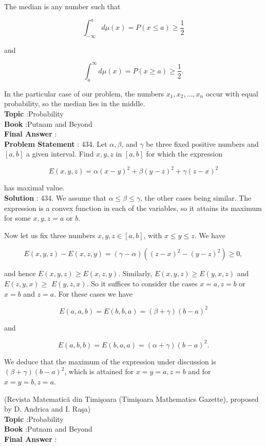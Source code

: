 \documentclass[10pt]{article}
\begin{document}
The median is any number such that

$$
\int_{-\infty}^{a} d \mu(x)=P(x \leq a) \geq \frac{1}{2}
$$

and

$$
\int_{a}^{\infty} d \mu(x)=P(x \geq a) \geq \frac{1}{2} .
$$

In the particular case of our problem, the numbers $x_{1}, x_{2}, \ldots, x_{n}$ occur with equal probability, so the median lies in the middle.
\\
\textbf{Topic} :Probability\\
\textbf{Book} :Putnam and Beyond\\
\textbf{Final Answer} :\\


\textbf{Problem Statement} :
434. Let $\alpha, \beta$, and $\gamma$ be three fixed positive numbers and $[a, b]$ a given interval. Find $x, y, z$ in $[a, b]$ for which the expression

$$
E(x, y, z)=\alpha(x-y)^{2}+\beta(y-z)^{2}+\gamma(z-x)^{2}
$$

has maximal value.
\\
\textbf{Solution} :
434. We assume that $\alpha \leq \beta \leq \gamma$, the other cases being similar. The expression is a convex function in each of the variables, so it attains its maximum for some $x, y, z=a$ or $b$.

Now let us fix three numbers $x, y, z \in[a, b]$, with $x \leq y \leq z$. We have

$$
E(x, y, z)-E(x, z, y)=(\gamma-\alpha)\left((z-x)^{2}-(y-z)^{2}\right) \geq 0,
$$

and hence $E(x, y, z) \geq E(x, z, y)$. Similarly, $E(x, y, z) \geq E(y, x, z)$ and $E(z, y, x) \geq$ $E(y, z, x)$. So it suffices to consider the cases $x=a, z=b$ or $x=b$ and $z=a$. For these cases we have

$$
E(a, a, b)=E(b, b, a)=(\beta+\gamma)(b-a)^{2}
$$

and

$$
E(a, b, b)=E(b, a, a)=(\alpha+\gamma)(b-a)^{2} .
$$

We deduce that the maximum of the expression under discussion is $(\beta+\gamma)(b-a)^{2}$, which is attained for $x=y=a, z=b$ and for $x=y=b, z=a$.

(Revista Matematică din Timişoara (Timişoara Mathematics Gazette), proposed by D. Andrica and I. Raşa)
\\
\textbf{Topic} :Probability\\
\textbf{Book} :Putnam and Beyond\\
\textbf{Final Answer} :\\
\end{document}
